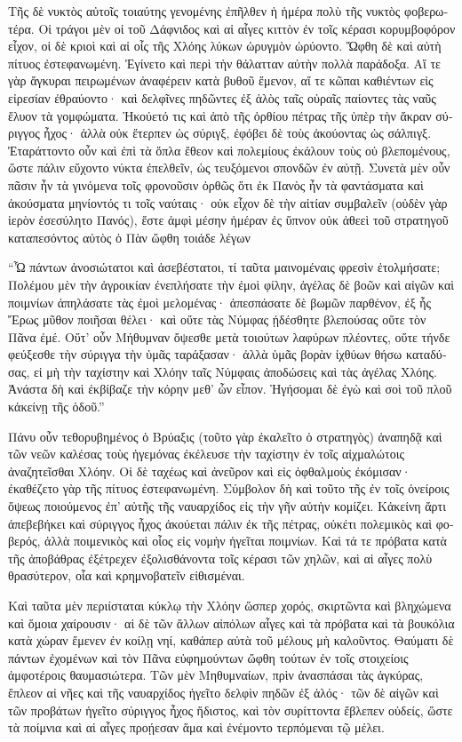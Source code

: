 \documentclass{book}
\begin{document}
\begin{pairs}
\begin{Leftside}
\begin{greek}
  Τῆς δὲ νυκτὸς αὐτοῖς τοιαύτης γενομένης ἐπῆλθεν ἡ ἡμέρα πολὺ τῆς νυκτὸς φοβερωτέρα. Οἱ τράγοι μὲν οἱ τοῦ Δάφνιδος καὶ αἱ αἶγες κιττὸν ἐν τοῖς κέρασι κορυμβοφόρον εἶχον, οἱ δὲ κριοὶ καὶ αἱ οἶς τῆς Χλόης λύκων ὠρυγμὸν ὠρύοντο.  Ὤφθη δὲ καὶ αὐτὴ πίτυος ἐστεφανωμένη. Ἐγίνετο καὶ περὶ τὴν θάλατταν αὐτὴν πολλὰ παράδοξα. Αἵ τε γὰρ ἄγκυραι πειρωμένων ἀναφέρειν κατὰ βυθοῦ ἔμενον, αἵ τε κῶπαι καθιέντων εἰς εἰρεσίαν ἐθραύοντο· καὶ δελφῖνες πηδῶντες ἐξ ἁλὸς ταῖς οὐραῖς παίοντες τὰς ναῦς ἔλυον τὰ γομφώματα.  Ἠκούετό τις καὶ ἀπὸ τῆς ὀρθίου πέτρας τῆς ὑπὲρ τὴν ἄκραν σύριγγος ἦχος· ἀλλὰ οὐκ ἔτερπεν ὡς σύριγξ, ἐφόβει δὲ τοὺς ἀκούοντας ὡς σάλπιγξ.  Ἐταράττοντο οὖν καὶ ἐπὶ τὰ ὅπλα ἔθεον καὶ πολεμίους ἐκάλουν τοὺς οὐ βλεπομένους, ὥστε πάλιν εὔχοντο νύκτα ἐπελθεῖν, ὡς τευξόμενοι σπονδῶν ἐν αὐτῇ.  Συνετὰ μὲν οὖν πᾶσιν ἦν τὰ γινόμενα τοῖς φρονοῦσιν ὀρθῶς ὅτι ἐκ Πανὸς ἦν τὰ φαντάσματα καὶ ἀκούσματα μηνίοντός τι τοῖς ναύταις· οὐκ εἶχον δὲ τὴν αἰτίαν συμβαλεῖν (οὐδὲν γὰρ ἱερὸν ἐσεσύλητο Πανός), ἔστε ἀμφὶ μέσην ἡμέραν ἐς ὕπνον οὐκ ἀθεεὶ τοῦ στρατηγοῦ καταπεσόντος αὐτὸς ὁ Πὰν ὤφθη τοιάδε λέγων
\pend


  “Ὦ πάντων ἀνοσιώτατοι καὶ ἀσεβέστατοι, τί ταῦτα μαινομέναις φρεσὶν ἐτολμήσατε; Πολέμου μὲν τὴν ἀγροικίαν ἐνεπλήσατε τὴν ἐμοὶ φίλην, ἀγέλας δὲ βοῶν καὶ αἰγῶν καὶ ποιμνίων ἀπηλάσατε τὰς ἐμοὶ μελομένας·  ἀπεσπάσατε δὲ βωμῶν παρθένον, ἐξ ἧς Ἔρως μῦθον ποιῆσαι θέλει· καὶ οὔτε τὰς Νύμφας ᾐδέσθητε βλεπούσας οὔτε τὸν Πᾶνα ἐμέ. Οὔτ’ οὖν Μήθυμναν ὄψεσθε μετὰ τοιούτων λαφύρων πλέοντες, οὔτε τήνδε φεύξεσθε τὴν σύριγγα τὴν ὑμᾶς ταράξασαν·  ἀλλὰ ὑμᾶς βορὰν ἰχθύων θήσω καταδύσας, εἰ μὴ τὴν ταχίστην καὶ Χλόην ταῖς Νύμφαις ἀποδώσεις καὶ τὰς ἀγέλας Χλόης. Ἀνάστα δὴ καὶ ἐκβίβαζε τὴν κόρην μεθ’ ὧν εἶπον. Ἡγήσομαι δὲ ἐγὼ καὶ σοὶ τοῦ πλοῦ κἀκείνῃ τῆς ὁδοῦ.”
\pend


  Πάνυ οὖν τεθορυβημένος ὁ Βρύαξις (τοῦτο γὰρ ἐκαλεῖτο ὁ στρατηγὸς) ἀναπηδᾷ καὶ τῶν νεῶν καλέσας τοὺς ἡγεμόνας ἐκέλευσε τὴν ταχίστην ἐν τοῖς αἰχμαλώτοις ἀναζητεῖσθαι Χλόην.  Οἱ δὲ ταχέως καὶ ἀνεῦρον καὶ εἰς ὀφθαλμοὺς ἐκόμισαν· ἐκαθέζετο γὰρ τῆς πίτυος ἐστεφανωμένη. Σύμβολον δὴ καὶ τοῦτο τῆς ἐν τοῖς ὀνείροις ὄψεως ποιούμενος ἐπ’ αὐτῆς τῆς ναυαρχίδος εἰς τὴν γῆν αὐτὴν κομίζει.  Κἀκείνη ἄρτι ἀπεβεβήκει καὶ σύριγγος ἦχος ἀκούεται πάλιν ἐκ τῆς πέτρας, οὐκέτι πολεμικὸς καὶ φοβερός, ἀλλὰ ποιμενικὸς καὶ οἷος εἰς νομὴν ἡγεῖται ποιμνίων. Καὶ τά τε πρόβατα κατὰ τῆς ἀποβάθρας ἐξέτρεχεν ἐξολισθάνοντα τοῖς κέρασι τῶν χηλῶν, καὶ αἱ αἶγες πολὺ θρασύτερον, οἷα καὶ κρημνοβατεῖν εἰθισμέναι.
\pend


  Καὶ ταῦτα μὲν περιίσταται κύκλῳ τὴν Χλόην ὥσπερ χορός, σκιρτῶντα καὶ βληχώμενα καὶ ὅμοια χαίρουσιν· αἱ δὲ τῶν ἄλλων αἰπόλων αἶγες καὶ τὰ πρόβατα καὶ τὰ βουκόλια κατὰ χώραν ἔμενεν ἐν κοίλῃ νηί, καθάπερ αὐτὰ τοῦ μέλους μὴ καλοῦντος.  Θαύματι δὲ πάντων ἐχομένων καὶ τὸν Πᾶνα εὐφημούντων ὤφθη τούτων ἐν τοῖς στοιχείοις ἀμφοτέροις θαυμασιώτερα.  Τῶν μὲν Μηθυμναίων, πρὶν ἀνασπάσαι τὰς ἀγκύρας, ἔπλεον αἱ νῆες καὶ τῆς ναυαρχίδος ἡγεῖτο δελφὶν πηδῶν ἐξ ἁλός· τῶν δὲ αἰγῶν καὶ τῶν προβάτων ἡγεῖτο σύριγγος ἦχος ἥδιστος, καὶ τὸν συρίττοντα ἔβλεπεν οὐδείς, ὥστε τὰ ποίμνια καὶ αἱ αἶγες προῄεσαν ἅμα καὶ ἐνέμοντο τερπόμεναι τῷ μέλει.
\pend



\end{greek}
\end{Leftside}
\end{pairs}
\end{document}
